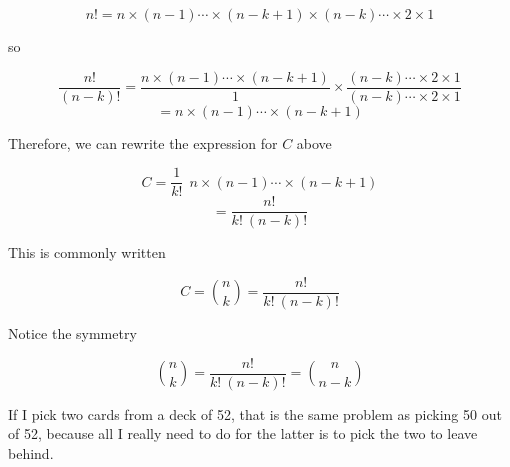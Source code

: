 \documentclass[11pt, oneside]{article}
\begin{document}
\[ n! = n \times (n-1) \cdots \times (n-k+1) \times (n-k) \cdots \times 2 \times 1 \]

so

\[ \frac{n! }{(n-k)!} = \frac{n \times (n-1) \cdots \times (n-k+1)}{1} \times \frac{(n-k) \cdots \times 2 \times 1}{(n-k) \cdots \times 2 \times 1 } \]
\[ = n \times (n-1) \cdots \times (n-k+1) \]

Therefore, we can rewrite the expression for $C$ above

\[ C = \frac{1}{k!} \ \ n \times (n-1) \cdots \times (n-k+1) \]
\[ = \frac{n!}{k! \ (n-k)!} \]

This is commonly written 

\[ C = {n \choose k} = \frac{n!}{k! \ (n-k)!} \]

Notice the symmetry

\[ {n \choose k} = \frac{n!}{k! \ (n-k)!} = {n \choose n-k} \]

If I pick two cards from a deck of 52, that is the same problem as picking 50 out of 52, because all I really need to do for the latter  is to pick the two to leave behind.
\end{document}
